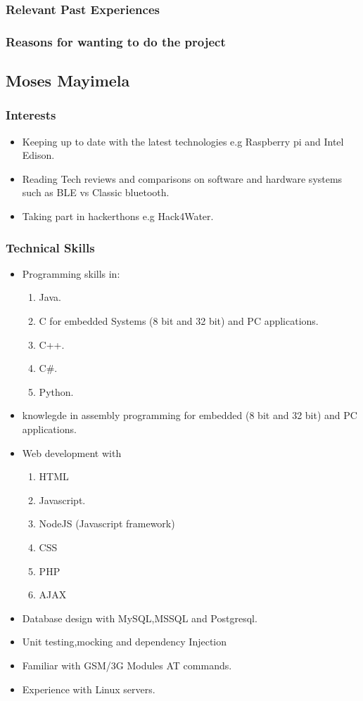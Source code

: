 \documentclass[a4paper,12pt]{article}
\begin{document}
\subsubsection{Relevant Past Experiences}
\subsubsection{Reasons for wanting to do the project}
\subsection{Moses Mayimela}
\subsubsection{Interests}
\begin{itemize}
\item Keeping up to date with the latest technologies e.g Raspberry pi and Intel Edison.
\item Reading Tech reviews and comparisons on software and hardware systems such as BLE vs Classic bluetooth.
\item Taking part in hackerthons e.g Hack4Water.
\end{itemize}
\subsubsection{Technical Skills}
\begin{itemize}
\item Programming skills in:
\begin{enumerate}
\item Java.
\item C for embedded Systems (8 bit and 32 bit) and PC applications.
\item C++.
\item C\#.
\item Python.
\end{enumerate}
\item knowlegde in assembly programming for embedded (8 bit and 32 bit) and PC applications.
\item Web development with
\begin{enumerate}
\item HTML
\item Javascript.
\item NodeJS (Javascript framework)
\item CSS
\item PHP
\item AJAX
\end{enumerate}
\item Database design with MySQL,MSSQL and Postgresql.
\item Unit testing,mocking and dependency Injection
\item Familiar with GSM/3G Modules AT commands.
\item Experience with Linux servers.
\end{itemize}
\end{document}

